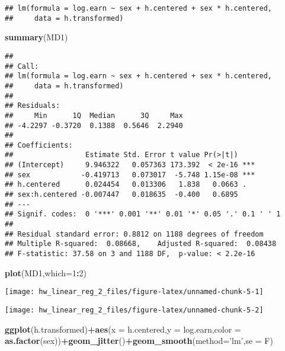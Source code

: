 \documentclass[]{article}
\newenvironment{Shaded}{\begin{snugshade}}{\end{snugshade}}
\newcommand{\DataTypeTok}[1]{\textcolor[rgb]{0.13,0.29,0.53}{#1}}
\newcommand{\DecValTok}[1]{\textcolor[rgb]{0.00,0.00,0.81}{#1}}
\newcommand{\KeywordTok}[1]{\textcolor[rgb]{0.13,0.29,0.53}{\textbf{#1}}}
\newcommand{\NormalTok}[1]{#1}
\newcommand{\OperatorTok}[1]{\textcolor[rgb]{0.81,0.36,0.00}{\textbf{#1}}}
\newcommand{\StringTok}[1]{\textcolor[rgb]{0.31,0.60,0.02}{#1}}
\begin{document}
\begin{verbatim}
## lm(formula = log.earn ~ sex + h.centered + sex * h.centered, 
##     data = h.transformed)
\end{verbatim}

\begin{Shaded}
\begin{Highlighting}[]
\KeywordTok{summary}\NormalTok{(MD1)}
\end{Highlighting}
\end{Shaded}

\begin{verbatim}
## 
## Call:
## lm(formula = log.earn ~ sex + h.centered + sex * h.centered, 
##     data = h.transformed)
## 
## Residuals:
##     Min      1Q  Median      3Q     Max 
## -4.2297 -0.3720  0.1388  0.5646  2.2940 
## 
## Coefficients:
##                 Estimate Std. Error t value Pr(>|t|)    
## (Intercept)     9.946322   0.057363 173.392  < 2e-16 ***
## sex            -0.419713   0.073017  -5.748 1.15e-08 ***
## h.centered      0.024454   0.013306   1.838   0.0663 .  
## sex:h.centered -0.007447   0.018635  -0.400   0.6895    
## ---
## Signif. codes:  0 '***' 0.001 '**' 0.01 '*' 0.05 '.' 0.1 ' ' 1
## 
## Residual standard error: 0.8812 on 1188 degrees of freedom
## Multiple R-squared:  0.08668,    Adjusted R-squared:  0.08438 
## F-statistic: 37.58 on 3 and 1188 DF,  p-value: < 2.2e-16
\end{verbatim}

\begin{Shaded}
\begin{Highlighting}[]
\KeywordTok{plot}\NormalTok{(MD1,}\DataTypeTok{which=}\DecValTok{1}\OperatorTok{:}\DecValTok{2}\NormalTok{)}
\end{Highlighting}
\end{Shaded}

\begin{center}\texttt{[image: hw\_linear\_reg\_2\_files/figure-latex/unnamed-chunk-5-1]} \end{center}

\begin{center}\texttt{[image: hw\_linear\_reg\_2\_files/figure-latex/unnamed-chunk-5-2]} \end{center}

\begin{Shaded}
\begin{Highlighting}[]
\KeywordTok{ggplot}\NormalTok{(h.transformed)}\OperatorTok{+}\KeywordTok{aes}\NormalTok{(}\DataTypeTok{x =}\NormalTok{ h.centered,}\DataTypeTok{y =}\NormalTok{ log.earn,}\DataTypeTok{color =} \KeywordTok{as.factor}\NormalTok{(sex))}\OperatorTok{+}\KeywordTok{geom_jitter}\NormalTok{()}\OperatorTok{+}\KeywordTok{geom_smooth}\NormalTok{(}\DataTypeTok{method=}\StringTok{'lm'}\NormalTok{,}\DataTypeTok{se =}\NormalTok{ F)}
\end{Highlighting}
\end{Shaded}
\end{document}
